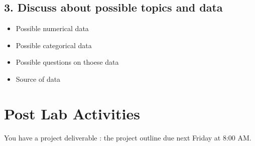 \documentclass[12pt]{article}
\begin{document}
\subsection*{3. Discuss about possible topics and data }

\begin{itemize}
    \item Possible numerical data
\end{itemize}

\vspace{2\baselineskip}

\begin{itemize}
    \item Possible categorical data
\end{itemize}

\vspace{2\baselineskip}

\begin{itemize}
    \item Possible questions on thoese data
\end{itemize}

\vspace{2\baselineskip}

\begin{itemize}
    \item Source of data 
\end{itemize}


\vspace{2\baselineskip}

\section*{Post Lab Activities}
You have a project deliverable : the project outline due next Friday at 8:00 AM.
\end{document}
